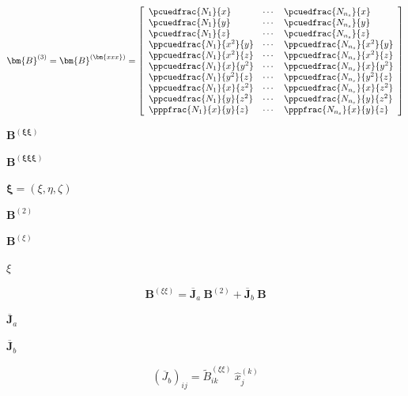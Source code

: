 \documentclass{article}
\begin{document}
\[ \begin{equation}\label{eqn:B3}
\bm{B}^{(3)} = \bm{B}^{(\bm{xxx})} =
    \left[ \begin{array}{lll} 
        \pcuedfrac{N_1}{x} &
        \cdots &
        \pcuedfrac{N_{n_s}}{x}
        \\
        \pcuedfrac{N_1}{y} &
        \cdots &
        \pcuedfrac{N_{n_s}}{y}
        \\
        \pcuedfrac{N_1}{z} &
        \cdots &
        \pcuedfrac{N_{n_s}}{z}
        \\
        \ppcuedfrac{N_1}{x^2}{y} &
        \cdots &
        \ppcuedfrac{N_{n_s}}{x^2}{y}
        \\ 
        \ppcuedfrac{N_1}{x^2}{z} &
        \cdots &
        \ppcuedfrac{N_{n_s}}{x^2}{z}
        \\ 
        \ppcuedfrac{N_1}{x}{y^2} &
        \cdots &
        \ppcuedfrac{N_{n_s}}{x}{y^2}
        \\ 
        \ppcuedfrac{N_1}{y^2}{z} &
        \cdots &
        \ppcuedfrac{N_{n_s}}{y^2}{z}
        \\ 
        \ppcuedfrac{N_1}{x}{z^2} &
        \cdots &
        \ppcuedfrac{N_{n_s}}{x}{z^2}
        \\ 
        \ppcuedfrac{N_1}{y}{z^2} &
        \cdots &
        \ppcuedfrac{N_{n_s}}{y}{z^2}
        \\ 
        \pppfrac{N_1}{x}{y}{z} &
        \cdots &
        \pppfrac{N_{n_s}}{x}{y}{z}
    \end{array} \right] 
\end{equation} \]
\pagebreak

$ \bm{B}^{(\bm{\xi\xi})} $
\pagebreak

$ \bm{B}^{(\bm{\xi\xi\xi})} $
\pagebreak

$ \bm{\xi} = (\xi,\eta,\zeta) $
\pagebreak

$ \bm{B}^{(2)} $
\pagebreak

$ \bm{B}^{(\xi)} $
\pagebreak

$ \xi $
\pagebreak

\[ \begin{equation}\label{eqn:2nd_derivative_xi}
    \bm{B}^{(\xi\xi)} = 
    \overline{\bm{J}}_a \ \bm{B}^{(2)} 
    + \overline{\bm{J}}_b \ \bm{B}
\end{equation} \]
\pagebreak

$ \overline{\bm{J}}_a $
\pagebreak

$ \overline{\bm{J}}_b $
\pagebreak

\[ \begin{equation}\label{eqn:2nd_geometric_derivatives}
    \left( \overline{J}_{b} \right)_{ij}  
    = \widetilde{B}^{(\xi\xi)}_{ik} \ \hat{x}_j^{(k)}
\end{equation} \]
\pagebreak
\end{document}
